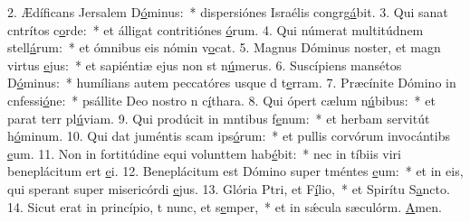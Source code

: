 2. Ædíficans Jersalem D\uline{ó}minus:~* dispersiónes Israélis congrg\uline{á}bit.
3. Qui sanat cntrítos c\uline{o}rde:~* et álligat contritiónes \uline{ó}rum.
4. Qui númerat multitúdnem stell\uline{á}rum:~* et ómnibus eis nómin v\uline{o}cat.
5. Magnus Dóminus noster, et magn virtus \uline{e}jus:~* et sapiéntiæ ejus non st n\uline{ú}merus.
6. Suscípiens mansétos D\uline{ó}minus:~* humílians autem peccatóres usque d t\uline{e}rram.
7. Præcínite Dómino in cnfessi\uline{ó}ne:~* psállite Deo nostro n c\uline{í}thara.
8. Qui ópert cælum n\uline{ú}bibus:~* et parat terr pl\uline{ú}viam.
9. Qui prodúcit in mntibus f\uline{e}num:~* et herbam servitút h\uline{ó}minum.
10. Qui dat juméntis scam ips\uline{ó}rum:~* et pullis corvórum invocántibs \uline{e}um.
11. Non in fortitúdine equi volunttem hab\uline{é}bit:~* nec in tíbiis viri beneplácitum ert \uline{e}i.
12. Beneplácitum est Dómino super tméntes \uline{e}um:~* et in eis, qui sperant super misericórdi \uline{e}jus.
13. Glória Ptri, et F\uline{í}lio,~* et Spirítu S\uline{a}ncto.
14. Sicut erat in princípio, t nunc, et s\uline{e}mper,~* et in sǽcula sæculórm. \uline{A}men.
